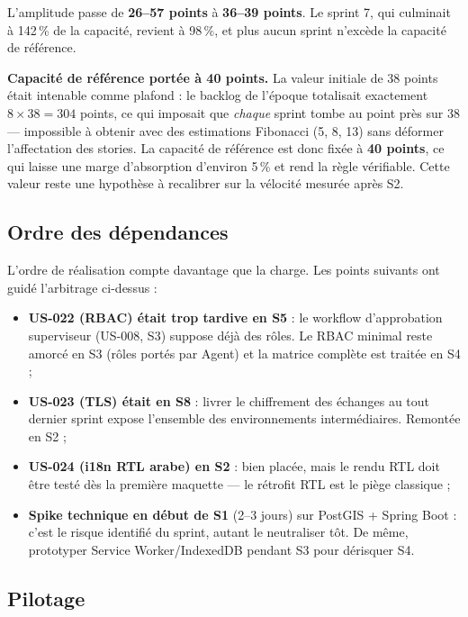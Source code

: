 L'amplitude passe de \textbf{26--57 points} à \textbf{36--39 points}. Le
sprint 7, qui culminait à 142\,\% de la capacité, revient à 98\,\%, et plus
aucun sprint n'excède la capacité de référence.

\begin{encadre}
\textbf{Capacité de référence portée à 40 points.} La valeur initiale de
38 points était intenable comme plafond : le backlog de l'époque totalisait
exactement $8 \times 38 = 304$ points, ce qui imposait que \emph{chaque} sprint tombe
au point près sur 38 --- impossible à obtenir avec des estimations
Fibonacci (5, 8, 13) sans déformer l'affectation des stories. La capacité de
référence est donc fixée à \textbf{40 points}, ce qui laisse une marge
d'absorption d'environ 5\,\% et rend la règle vérifiable. Cette valeur reste
une hypothèse à recalibrer sur la vélocité mesurée après S2.
\end{encadre}

\subsection{Ordre des dépendances}

L'ordre de réalisation compte davantage que la charge. Les points suivants
ont guidé l'arbitrage ci-dessus :

\begin{itemize}
  \item \textbf{US-022 (RBAC) était trop tardive en S5} : le workflow
        d'approbation superviseur (US-008, S3) suppose déjà des rôles. Le
        RBAC minimal reste amorcé en S3 (rôles portés par Agent) et la
        matrice complète est traitée en S4 ;
  \item \textbf{US-023 (TLS) était en S8} : livrer le chiffrement des
        échanges au tout dernier sprint expose l'ensemble des
        environnements intermédiaires. Remontée en S2 ;
  \item \textbf{US-024 (i18n RTL arabe) en S2} : bien placée, mais le rendu
        RTL doit être testé dès la première maquette --- le rétrofit RTL est
        le piège classique ;
  \item \textbf{Spike technique en début de S1} (2--3 jours) sur PostGIS +
        Spring Boot : c'est le risque identifié du sprint, autant le neutraliser
        tôt. De même, prototyper Service Worker/IndexedDB pendant S3 pour
        dérisquer S4.
\end{itemize}

\subsection{Pilotage}

